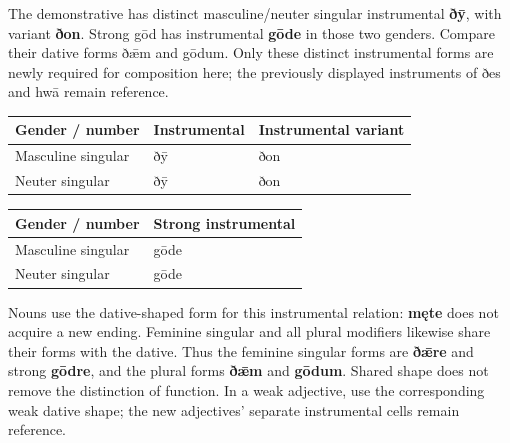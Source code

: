 The demonstrative has distinct masculine/\allowbreak{}neuter singular instrumental \textbf{ðȳ}, with variant \textbf{ðon}. Strong gōd has instrumental \textbf{gōde} in those two genders. Compare their dative forms ðǣm and gōdum. Only these distinct instrumental forms are newly required for composition here; the previously displayed instruments of ðes and hwā remain reference.

\par\begingroup
\fontsize{10.5}{13.2}\selectfont
\setlength{\LTleft}{0pt}\setlength{\LTright}{\fill}
\noindent
\begin{tabular}{@{}>{\raggedright\arraybackslash}p{38.0mm}>{\raggedright\arraybackslash}p{34.94mm}>{\raggedright\arraybackslash}p{45.43mm}@{}}
\toprule
\textbf{Gender /\allowbreak{} number} & \textbf{Instrumental} & \textbf{Instrumental variant} \\
\midrule
Masculine singular & ðȳ & ðon \\
Neuter singular & ðȳ & ðon \\
\bottomrule
\end{tabular}
\par\endgroup

\par\begingroup
\fontsize{10.5}{13.2}\selectfont
\setlength{\LTleft}{0pt}\setlength{\LTright}{\fill}
\noindent
\begin{tabular}{@{}>{\raggedright\arraybackslash}p{56.08mm}>{\raggedright\arraybackslash}p{65.11mm}@{}}
\toprule
\textbf{Gender /\allowbreak{} number} & \textbf{Strong instrumental} \\
\midrule
Masculine singular & gōde \\
Neuter singular & gōde \\
\bottomrule
\end{tabular}
\par\endgroup

Nouns use the dative-shaped form for this instrumental relation: \textbf{męte} does not acquire a new ending. Feminine singular and all plural modifiers likewise share their forms with the dative. Thus the feminine singular forms are \textbf{ðǣre} and strong \textbf{gōdre}, and the plural forms \textbf{ðǣm} and \textbf{gōdum}. Shared shape does not remove the distinction of function. In a weak adjective, use the corresponding weak dative shape; the new adjectives' separate instrumental cells remain reference.


